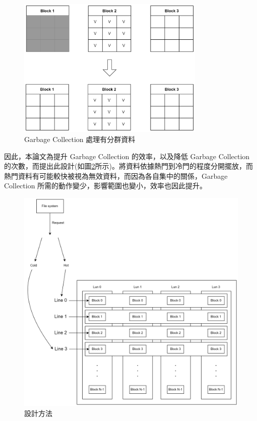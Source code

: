 \begin{figure}[H]
    \centering
    \includegraphics[width=0.8\textwidth]{picture/ch3/gc_efficiency_2.png}
    \caption{Garbage Collection 處理有分群資料}
    \label{f3.2}
\end{figure}

\indent
因此，本論文為提升 Garbage Collection 的效率，以及降低 Garbage Collection 的次數，而提出此設計(如圖\ref{f3.3}所示)。將資料依據熱門到冷門的程度分開擺放，而熱門資料有可能較快被視為無效資料，而因為各自集中的關係，Garbage Collection 所需的動作變少，影響範圍也變小，效率也因此提升。
\begin{figure}[H]
    \centering
    \includegraphics[width=1\textwidth]{picture/ch3/method_3.png}
    \caption{設計方法}
    \label{f3.3}
\end{figure}

